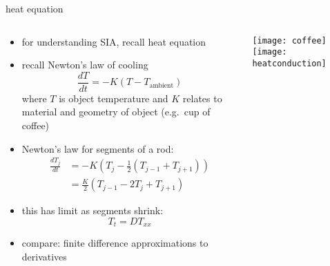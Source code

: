 \begin{frame}{heat equation}
\label{slide:heatcompare}

\small
\begin{columns}
\begin{column}{0.6\textwidth}
\begin{itemize}
\item for understanding SIA, recall heat equation
\item recall Newton's law of cooling
	$$\frac{dT}{dt} = -K (T-T_{\text{ambient}})$$
where $T$ is object temperature and $K$ relates to material and geometry of object (e.g.~cup of coffee)
\item Newton's law for segments of a rod:
\begin{align*}
\frac{dT_j}{dt} &= -K \left(T_j - \frac{1}{2} (T_{j-1} + T_{j+1}) \right) \\
	&= \frac{K}{2} \left(T_{j-1} - 2 T_j + T_{j+1}\right) 
\end{align*}
\item this has limit as segments shrink:
	$$T_t = D T_{xx}$$
\item compare: finite difference approximations to derivatives
\end{itemize}
\end{column}

\begin{column}{0.4\textwidth}
\hfill
\texttt{[image: coffee]}
\vspace{1.0in}
\texttt{[image: heatconduction]}
\end{column}
\end{columns}
\end{frame}


